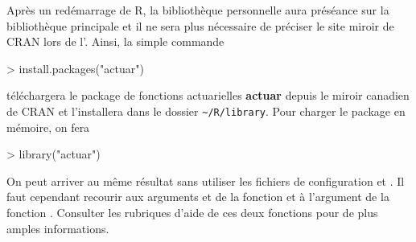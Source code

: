 Après un redémarrage de R, la bibliothèque personnelle aura préséance
sur la bibliothèque principale et il ne sera plus nécessaire de
préciser le site miroir de CRAN lors de l'. Ainsi, la simple commande
\begin{Schunk}
\begin{Sinput}
> install.packages("actuar")
\end{Sinput}
\end{Schunk}
téléchargera le package de fonctions actuarielles \textbf{actuar}
depuis le miroir canadien de CRAN et l'installera dans le dossier
\verb=~/R/library=. Pour charger le package en mémoire, on fera
\begin{Schunk}
\begin{Sinput}
> library("actuar")
\end{Sinput}
\end{Schunk}

On peut arriver au même résultat sans utiliser les fichiers de
configuration  et . Il faut cependant
recourir aux arguments  et  de la fonction
 et à l'argument  de la fonction
. Consulter les rubriques d'aide de ces deux fonctions
pour de plus amples informations.

